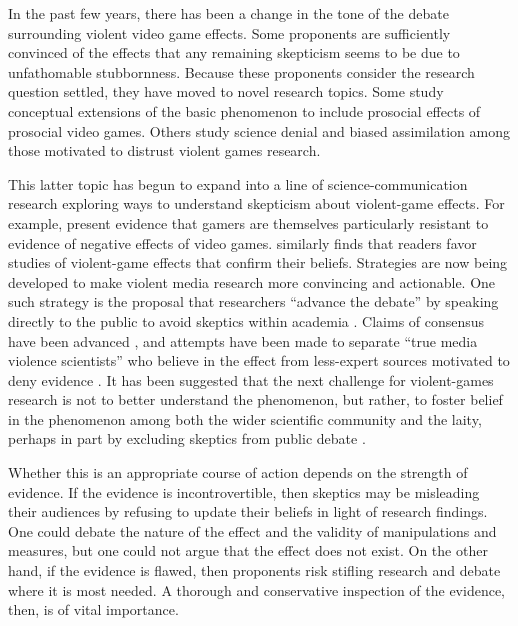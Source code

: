 \documentclass[man]{apa6}
\begin{document}
In the past few years, there has been a change in the tone of the debate surrounding violent video game effects. Some proponents are sufficiently convinced of the effects that any remaining skepticism seems to be due to unfathomable stubbornness. Because these proponents consider the research question settled, they have moved to novel research topics. Some study conceptual extensions of the basic phenomenon to include prosocial effects of prosocial video games. Others study science denial and biased assimilation among those motivated to distrust violent games research. 

This latter topic has begun to expand into a line of science-communication research exploring ways to understand skepticism about violent-game effects.   For example, \citet{Nauroth:etal:2014} present evidence that gamers are themselves particularly resistant to evidence of negative effects of video games. \citet{Greitemeyer:2014} similarly finds that readers favor studies of violent-game effects that confirm their beliefs. Strategies are now being developed to make violent media research more convincing and actionable. One such strategy is the proposal that researchers ``advance the debate'' by speaking directly to the public to avoid skeptics within academia \citep{Strasburger:Donnerstein:2014}. Claims of consensus have been advanced \citep{Bushman:etal:2014}, and attempts have been made to separate ``true media violence scientists'' who believe in the effect from less-expert sources motivated to deny evidence \citep{Anderson:etal:2014}. It has been suggested that the next challenge for violent-games research is not to better understand the phenomenon, but rather, to foster belief in the phenomenon among both the wider scientific community and the laity, perhaps in part by excluding skeptics from public debate \citep{Anderson:etal:2014}.

Whether this is an appropriate course of action depends on the strength of evidence. If the evidence is incontrovertible, then skeptics may be misleading their audiences by refusing to update their beliefs in light of research findings. One could debate the nature of the effect and the validity of manipulations and measures, but one could not argue that the effect does not exist. On the other hand, if the evidence is flawed, then proponents risk stifling research and debate where it is most needed. A thorough and conservative inspection of the evidence, then, is of vital importance.
\end{document}
